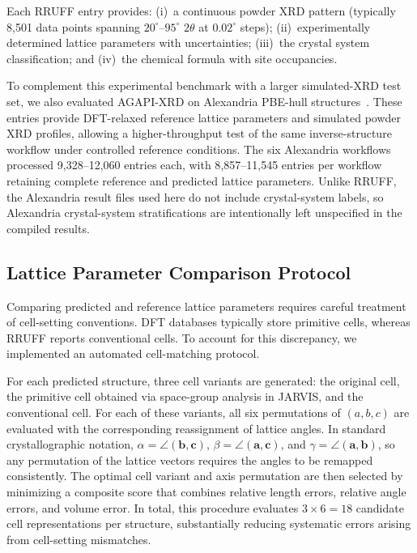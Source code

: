 \documentclass[pdflatex,sn-mathphys-num]{sn-jnl}
\theoremstyle{thmstyleone}
\theoremstyle{thmstyletwo}
\theoremstyle{thmstylethree}
\begin{document}
Each RRUFF entry provides: (i)~a continuous powder XRD pattern (typically 8{,}501 data points spanning $20^\circ$--$95^\circ$ $2\theta$ at $0.02^\circ$ steps); (ii)~experimentally determined lattice parameters with uncertainties; (iii)~the crystal system classification; and (iv)~the chemical formula with site occupancies.

To complement this experimental benchmark with a larger simulated-XRD test set, we also evaluated AGAPI-XRD on Alexandria PBE-hull structures~\cite{alexandria}. These entries provide DFT-relaxed reference lattice parameters and simulated powder XRD profiles, allowing a higher-throughput test of the same inverse-structure workflow under controlled reference conditions. The six Alexandria workflows processed 9{,}328--12{,}060 entries each, with 8{,}857--11{,}545 entries per workflow retaining complete reference and predicted lattice parameters. Unlike RRUFF, the Alexandria result files used here do not include crystal-system labels, so Alexandria crystal-system stratifications are intentionally left unspecified in the compiled results.


\subsection{Lattice Parameter Comparison Protocol}\label{sec:cellmatch}



Comparing predicted and reference lattice parameters requires careful treatment of cell-setting conventions. DFT databases typically store primitive cells, whereas RRUFF reports conventional cells. To account for this discrepancy, we implemented an automated cell-matching protocol.

For each predicted structure, three cell variants are generated: the original cell, the primitive cell obtained via space-group analysis in JARVIS, and the conventional cell. For each of these variants, all six permutations of $(a,b,c)$ are evaluated with the corresponding reassignment of lattice angles. In standard crystallographic notation, $\alpha=\angle(\mathbf{b},\mathbf{c})$, $\beta=\angle(\mathbf{a},\mathbf{c})$, and $\gamma=\angle(\mathbf{a},\mathbf{b})$, so any permutation of the lattice vectors requires the angles to be remapped consistently. The optimal cell variant and axis permutation are then selected by minimizing a composite score that combines relative length errors, relative angle errors, and volume error. In total, this procedure evaluates $3 \times 6 = 18$ candidate cell representations per structure, substantially reducing systematic errors arising from cell-setting mismatches.
\end{document}

